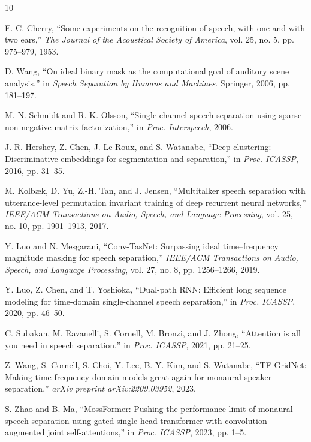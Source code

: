 \documentclass[conference]{IEEEtran}
\begin{document}

\begin{thebibliography}{10}

E. C. Cherry, ``Some experiments on the recognition of speech, with one and with two ears,'' \textit{The Journal of the Acoustical Society of America}, vol. 25, no. 5, pp. 975--979, 1953.

D. Wang, ``On ideal binary mask as the computational goal of auditory scene analysis,'' in \textit{Speech Separation by Humans and Machines}. Springer, 2006, pp. 181--197.

M. N. Schmidt and R. K. Olsson, ``Single-channel speech separation using sparse non-negative matrix factorization,'' in \textit{Proc. Interspeech}, 2006.

J. R. Hershey, Z. Chen, J. Le Roux, and S. Watanabe, ``Deep clustering: Discriminative embeddings for segmentation and separation,'' in \textit{Proc. ICASSP}, 2016, pp. 31--35.

M. Kolbæk, D. Yu, Z.-H. Tan, and J. Jensen, ``Multitalker speech separation with utterance-level permutation invariant training of deep recurrent neural networks,'' \textit{IEEE/ACM Transactions on Audio, Speech, and Language Processing}, vol. 25, no. 10, pp. 1901--1913, 2017.

Y. Luo and N. Mesgarani, ``Conv-TasNet: Surpassing ideal time--frequency magnitude masking for speech separation,'' \textit{IEEE/ACM Transactions on Audio, Speech, and Language Processing}, vol. 27, no. 8, pp. 1256--1266, 2019.

Y. Luo, Z. Chen, and T. Yoshioka, ``Dual-path RNN: Efficient long sequence modeling for time-domain single-channel speech separation,'' in \textit{Proc. ICASSP}, 2020, pp. 46--50.

C. Subakan, M. Ravanelli, S. Cornell, M. Bronzi, and J. Zhong, ``Attention is all you need in speech separation,'' in \textit{Proc. ICASSP}, 2021, pp. 21--25.

Z. Wang, S. Cornell, S. Choi, Y. Lee, B.-Y. Kim, and S. Watanabe, ``TF-GridNet: Making time-frequency domain models great again for monaural speaker separation,'' \textit{arXiv preprint arXiv:2209.03952}, 2023.

S. Zhao and B. Ma, ``MossFormer: Pushing the performance limit of monaural speech separation using gated single-head transformer with convolution-augmented joint self-attentions,'' in \textit{Proc. ICASSP}, 2023, pp. 1--5.


\end{thebibliography}
\end{document}
